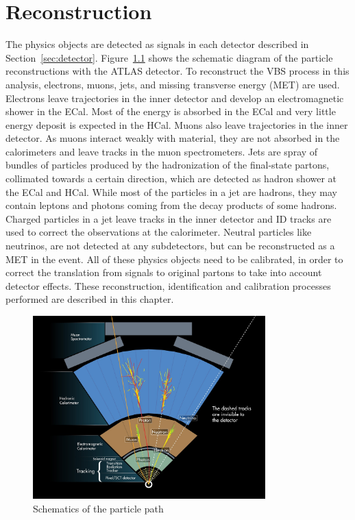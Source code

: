 \chapter{Reconstruction}
\label{chap:reconstruction}
The physics objects are detected as signals in each detector described in Section~\ref{sec:detector}.
Figure~\ref{fig:ParticlePath} shows the schematic diagram of the particle reconstructions with the ATLAS detector. 
To reconstruct the VBS process in this analysis, electrons, muons, jets, and missing transverse energy (MET) are used.
Electrons leave trajectories in the inner detector and develop an electromagnetic shower in the ECal. 
Most of the energy is absorbed in the ECal and very little energy deposit is expected in the HCal.
Muons also leave trajectories in the inner detector.
As muons interact weakly with material, they are not absorbed in the calorimeters and leave tracks in the muon spectrometers.
Jets are spray of bundles of particles produced by the hadronization of the final-state partons, collimated towards a certain direction, which are detected as hadron shower at the ECal and HCal. While most of the particles in a jet are hadrons, they may contain leptons and photons coming from the decay products of some hadrons. 
Charged particles in a jet leave tracks in the inner detector and ID tracks are used to correct the observations at the calorimeter. Neutral particles like neutrinos, are not detected at any subdetectors, but can be reconstructed as a MET in the event.
All of these physics objects need to be calibrated, in order to correct the translation from signals to original partons to take into account detector effects.
These reconstruction, identification and calibration processes performed are described in this chapter.

\begin{figure}[tbp]
\begin{center}
 \includegraphics[width=0.80\textwidth,keepaspectratio]{figures/Reconstruction/ParticlePath}
\caption{
Schematics of the particle path
}
\label{fig:ParticlePath}
\end{center}
\end{figure}
